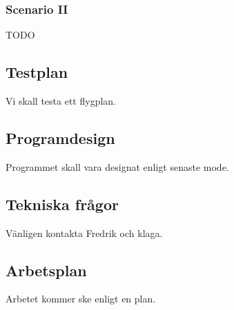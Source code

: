 \documentclass[11pt,a4paper]{article}
\begin{document}
\subsubsection{Scenario II}
TODO

\subsection{Testplan}
Vi skall testa ett flygplan.

\subsection{Programdesign}
Programmet skall vara designat enligt senaste mode.

\subsection{Tekniska frågor}
Vänligen kontakta Fredrik och klaga.

\subsection{Arbetsplan}
Arbetet kommer ske enligt en plan.
\end{document}
